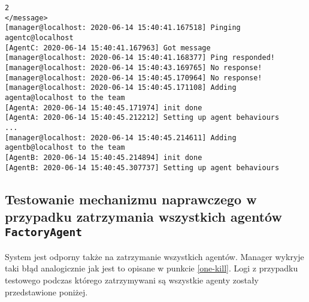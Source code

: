 \begin{lstlisting}
2
</message>
[manager@localhost: 2020-06-14 15:40:41.167518] Pinging agentc@localhost
[AgentC: 2020-06-14 15:40:41.167963] Got message
[manager@localhost: 2020-06-14 15:40:41.168377] Ping responded!
[manager@localhost: 2020-06-14 15:40:43.169765] No response!
[manager@localhost: 2020-06-14 15:40:45.170964] No response!
[manager@localhost: 2020-06-14 15:40:45.171108] Adding agenta@localhost to the team
[AgentA: 2020-06-14 15:40:45.171974] init done
[AgentA: 2020-06-14 15:40:45.212212] Setting up agent behaviours
...
[manager@localhost: 2020-06-14 15:40:45.214611] Adding agentb@localhost to the team
[AgentB: 2020-06-14 15:40:45.214894] init done
[AgentB: 2020-06-14 15:40:45.307737] Setting up agent behaviours
\end{lstlisting}
\subsection{Testowanie mechanizmu naprawczego w przypadku zatrzymania wszystkich agentów \texttt{FactoryAgent}}
System jest odporny także na zatrzymanie wszystkich agentów. Manager wykryje taki błąd analogicznie jak jest to opisane w punkcie \ref{one-kill}. Logi z przypadku testowego podczas którego zatrzymywani są wszystkie agenty zostały przedstawione poniżej.

